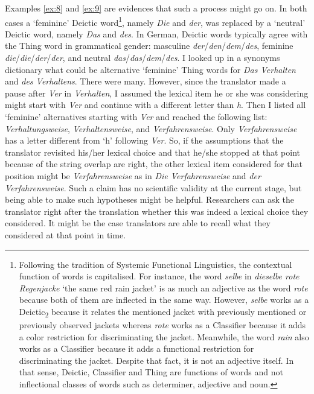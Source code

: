 Examples \ref{ex:8} and \ref{ex:9} are evidences that such a process might go on. In both cases a `feminine' Deictic word\footnote{Following the tradition of Systemic Functional Linguistics, the contextual function of words is capitalised. For instance, the word \emph{selbe} in \emph{dieselbe rote Regenjacke} `the same red rain jacket' is as much an adjective as the word \emph{rote} because both of them are inflected in the same way. However, \emph{selbe} works as a Deictic\textsubscript{2} because it relates the mentioned jacket with previously mentioned or previously observed jackets whereas \emph{rote} works as a Classifier because it adds a color restriction for discriminating the jacket. Meanwhile, the word \emph{rain} also works as a Classifier because it adds a functional restriction for discriminating the jacket. Despite that fact, it is not an adjective itself. In that sense, Deictic, Classifier and Thing are functions of words and not inflectional classes of words such as determiner, adjective and noun.}, namely \emph{Die} and \emph{der}, was replaced by a `neutral' Deictic word, namely \emph{Das} and \emph{des}. In German, Deictic words typically agree with the Thing word in grammatical gender: masculine \emph{der}/\emph{den}/\emph{dem}/\emph{des}, feminine \emph{die}/\emph{die}/\emph{der}/\emph{der}, and neutral \emph{das}/\emph{das}/\emph{dem}/\emph{des}. I looked up in a synonyms dictionary what could be alternative `feminine' Thing words for \emph{Das Verhalten} and \emph{des Verhaltens}. There were many. However, since the translator made a pause after \emph{Ver} in \emph{Verhalten}, I assumed the lexical item he or she was considering might start with \emph{Ver} and continue with a different letter than \emph{h}. Then I listed all `feminine' alternatives starting with \emph{Ver} and reached the following list: \emph{Verhaltungsweise}, \emph{Verhaltensweise}, and \emph{Verfahrensweise}. Only \emph{Verfahrensweise} has a letter different from `h' following \emph{Ver}. So, if the assumptions that the translator revisited his/her lexical choice and that he/she stopped at that point because of the string overlap are right, the other lexical item considered for that position might be \emph{Verfahrensweise} as in \emph{Die Verfahrensweise} and \emph{der Verfahrensweise}.
Such a claim has no scientific validity at the current stage, but being able to make such hypotheses might be helpful. Researchers can ask the translator right after the translation whether this was indeed a lexical choice they considered. It might be the case translators are able to recall what they considered at that point in time.


